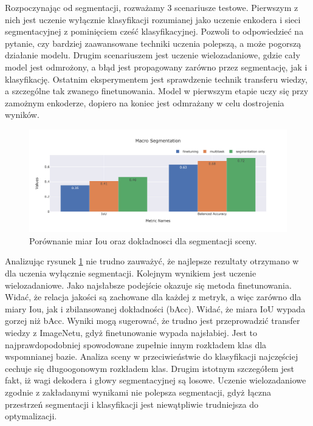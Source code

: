 \vspace{0.5cm}
Rozpoczynając od segmentacji, rozważamy 3 scenariusze testowe. Pierwszym z nich jest uczenie wyłącznie klasyfikacji rozumianej jako uczenie enkodera i sieci segmentacyjnej z pominięciem cześć klasyfikacyjnej. Pozwoli to odpowiedzieć na pytanie, czy bardziej zaawansowane techniki uczenia polepszą, a może pogorszą działanie modelu. Drugim scenariuszem jest uczenie wielozadaniowe, gdzie cały model jest odmrożony, a błąd jest propagowany zarówno przez segmentację, jak i klasyfikację. Ostatnim eksperymentem jest sprawdzenie technik transferu wiedzy, a szczególne tak zwanego finetunowania. Model w pierwszym etapie uczy się przy zamożnym enkoderze, dopiero na koniec jest odmrażany w celu dostrojenia wyników.

\begin{figure}[ht!]
    \centering
    \includegraphics[width=\textwidth]{result_imgs_sorted/Macro-Segmentation.jpeg}
    \caption{Porównanie miar Iou oraz dokładnosci dla segmentacji sceny.}
    \label{fig:macro-segmentation}
\end{figure}

Analizując rysunek \ref{fig:macro-segmentation} nie trudno zauważyć, że najlepsze rezultaty otrzymano w dla uczenia wyłącznie segmentacji. Kolejnym wynikiem jest uczenie wielozadaniowe. Jako najsłabsze podejście okazuje się metoda finetunowania. Widać, że relacja jakości są zachowane dla każdej z metryk, a więc zarówno dla miary Iou, jak i zbilansowanej dokładności (bAcc). Widać, że miara IoU wypada gorzej niż bAcc. Wyniki mogą sugerować, że trudno jest przeprowadzić transfer wiedzy z ImageNetu, gdyż finetunowanie wypada najsłabiej. Jest to najprawdopodobniej spowodowane zupełnie innym rozkładem klas dla wspomnianej bazie. Analiza sceny w przeciwieństwie do klasyfikacji najczęściej cechuje się długoogonowym rozkładem klas. Drugim istotnym szczegółem jest fakt, iż wagi dekodera i głowy segmentacyjnej są losowe. Uczenie wielozadaniowe zgodnie z zakładanymi wynikami nie polepsza segmentacji, gdyż łączna przestrzeń segmentacji i klasyfikacji jest niewątpliwie trudniejsza do optymalizacji.

